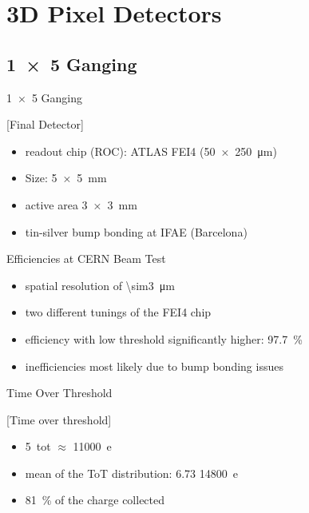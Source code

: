 \section{3D Pixel Detectors}
\subsection{\SI{1x5}{} Ganging}
\begin{frame}{\SI{1x5}{} Ganging}

	[Final Detector]	
	
	\begin{itemize}\itemfill
		\item readout chip (ROC): ATLAS FEI4 (\SI{50x250}{\micro\meter})
		\item Size: \SI{5x5}{\milli\meter}
		\item active area \SI{3x3}{\milli\meter}
		\item tin-silver bump bonding at IFAE (Barcelona)
	\end{itemize}
	
\end{frame}
\begin{frame}{Efficiencies at CERN Beam Test}

	
	\begin{itemize}\itemfill
		\item spatial resolution of \SI{\sim3}{\micro\meter}
		\item two different tunings of the FEI4 chip
		\item efficiency with low threshold significantly higher: \SI{97.7}{\%}
		\item inefficiencies most likely due to bump bonding issues
	\end{itemize}
	
\end{frame}
\begin{frame}{Time Over Threshold}

	[Time over threshold]	
	
	\begin{itemize}\itemfill
		\item \SI{5}{tot} $\approx$ \SI{11000}{e}
		\item mean of the ToT distribution: 6.73 \ra \SI{14800}{e}
		\item \SI{81}{\%} of the charge collected
	\end{itemize}
	
\end{frame}
